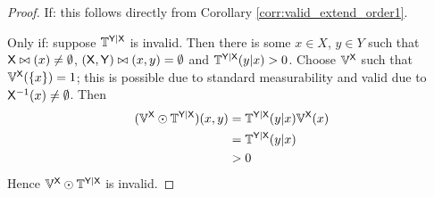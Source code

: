 \begin{proof}
If: this follows directly from Corollary \ref{corr:valid_extend_order1}.

Only if: suppose $\mathbb{T}^{\mathsf{Y}|\mathsf{X}}$ is invalid. Then there is some $x\in X$, $y\in Y$ such that $\mathsf{X}\bowtie(x)\neq \emptyset$, $(\mathsf{X},\mathsf{Y})\bowtie(x,y)=\emptyset$ and $\mathbb{T}^{\mathsf{Y}|\mathsf{X}}(y|x)>0$. Choose $\mathbb{V}^{\mathsf{X}}$ such that $\mathbb{V}^{\mathsf{X}}(\{x\})=1$; this is possible due to standard measurability and valid due to $\mathsf{X}^{-1}(x)\neq \emptyset$. Then
\begin{align}
	(\mathbb{V}^{\mathsf{X}}\odot \mathbb{T}^{\mathsf{Y}|\mathsf{X}})(x,y) &= \mathbb{T}^{\mathsf{Y}|\mathsf{X}}(y|x) \mathbb{V}^{\mathsf{X}}(x)\\
																	 &= \mathbb{T}^{\mathsf{Y}|\mathsf{X}}(y|x)\\
																	 &>0
\end{align}
Hence $\mathbb{V}^{\mathsf{X}}\odot \mathbb{T}^{\mathsf{Y}|\mathsf{X}}$ is invalid.
\end{proof}









